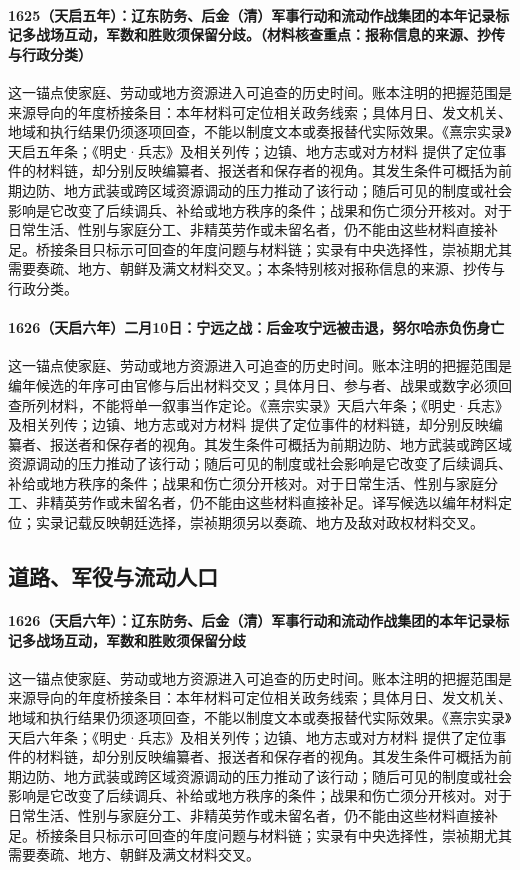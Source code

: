 \paragraph{1625（天启五年）：辽东防务、后金（清）军事行动和流动作战集团的本年记录标记多战场互动，军数和胜败须保留分歧。（材料核查重点：报称信息的来源、抄传与行政分类）} 这一锚点使家庭、劳动或地方资源进入可追查的历史时间。账本注明的把握范围是来源导向的年度桥接条目：本年材料可定位相关政务线索；具体月日、发文机关、地域和执行结果仍须逐项回查，不能以制度文本或奏报替代实际效果。《熹宗实录》天启五年条；《明史·兵志》及相关列传；边镇、地方志或对方材料 提供了定位事件的材料链，却分别反映编纂者、报送者和保存者的视角。其发生条件可概括为前期边防、地方武装或跨区域资源调动的压力推动了该行动；随后可见的制度或社会影响是它改变了后续调兵、补给或地方秩序的条件；战果和伤亡须分开核对。对于日常生活、性别与家庭分工、非精英劳作或未留名者，仍不能由这些材料直接补足。桥接条目只标示可回查的年度问题与材料链；实录有中央选择性，崇祯期尤其需要奏疏、地方、朝鲜及满文材料交叉。；本条特别核对报称信息的来源、抄传与行政分类。

\paragraph{1626（天启六年）二月10日：宁远之战：后金攻宁远被击退，努尔哈赤负伤身亡} 这一锚点使家庭、劳动或地方资源进入可追查的历史时间。账本注明的把握范围是编年候选的年序可由官修与后出材料交叉；具体月日、参与者、战果或数字必须回查所列材料，不能将单一叙事当作定论。《熹宗实录》天启六年条；《明史·兵志》及相关列传；边镇、地方志或对方材料 提供了定位事件的材料链，却分别反映编纂者、报送者和保存者的视角。其发生条件可概括为前期边防、地方武装或跨区域资源调动的压力推动了该行动；随后可见的制度或社会影响是它改变了后续调兵、补给或地方秩序的条件；战果和伤亡须分开核对。对于日常生活、性别与家庭分工、非精英劳作或未留名者，仍不能由这些材料直接补足。译写候选以编年材料定位；实录记载反映朝廷选择，崇祯期须另以奏疏、地方及敌对政权材料交叉。

\subsection{道路、军役与流动人口}

\paragraph{1626（天启六年）：辽东防务、后金（清）军事行动和流动作战集团的本年记录标记多战场互动，军数和胜败须保留分歧} 这一锚点使家庭、劳动或地方资源进入可追查的历史时间。账本注明的把握范围是来源导向的年度桥接条目：本年材料可定位相关政务线索；具体月日、发文机关、地域和执行结果仍须逐项回查，不能以制度文本或奏报替代实际效果。《熹宗实录》天启六年条；《明史·兵志》及相关列传；边镇、地方志或对方材料 提供了定位事件的材料链，却分别反映编纂者、报送者和保存者的视角。其发生条件可概括为前期边防、地方武装或跨区域资源调动的压力推动了该行动；随后可见的制度或社会影响是它改变了后续调兵、补给或地方秩序的条件；战果和伤亡须分开核对。对于日常生活、性别与家庭分工、非精英劳作或未留名者，仍不能由这些材料直接补足。桥接条目只标示可回查的年度问题与材料链；实录有中央选择性，崇祯期尤其需要奏疏、地方、朝鲜及满文材料交叉。


